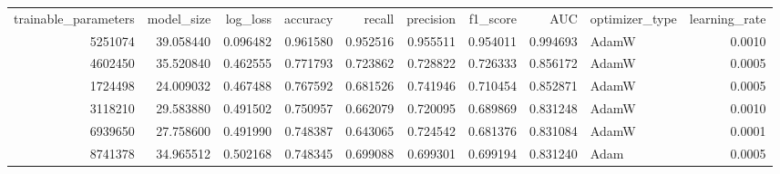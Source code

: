 \begin{tabular}{rrrrrrrrlr}
\toprule
 trainable\_parameters &  model\_size &  log\_loss &  accuracy &   recall &  precision &  f1\_score &      AUC & optimizer\_type &  learning\_rate \\
              5251074 &   39.058440 &  0.096482 &  0.961580 & 0.952516 &   0.955511 &  0.954011 & 0.994693 &          AdamW &         0.0010 \\
\midrule
              4602450 &   35.520840 &  0.462555 &  0.771793 & 0.723862 &   0.728822 &  0.726333 & 0.856172 &          AdamW &         0.0005 \\
              1724498 &   24.009032 &  0.467488 &  0.767592 & 0.681526 &   0.741946 &  0.710454 & 0.852871 &          AdamW &         0.0005 \\
              3118210 &   29.583880 &  0.491502 &  0.750957 & 0.662079 &   0.720095 &  0.689869 & 0.831248 &          AdamW &         0.0010 \\
              6939650 &   27.758600 &  0.491990 &  0.748387 & 0.643065 &   0.724542 &  0.681376 & 0.831084 &          AdamW &         0.0001 \\
              8741378 &   34.965512 &  0.502168 &  0.748345 & 0.699088 &   0.699301 &  0.699194 & 0.831240 &           Adam &         0.0005 \\
\bottomrule
\end{tabular}
